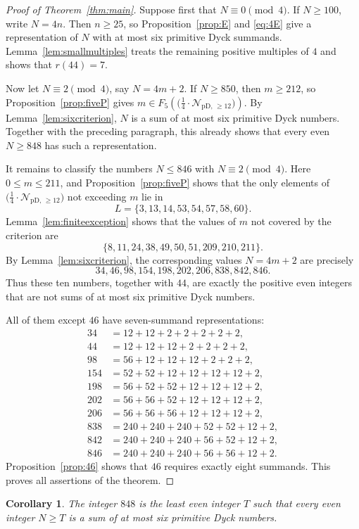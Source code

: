 \documentclass[12pt]{article}
\theoremstyle{plain}
\newtheorem{corollary}[theorem]{Corollary}
\newcommand{\Pset}{\bigl(\tfrac14\cdot
  \mathcal N_{\mathrm{pD,\,\geq12}}\bigr)}
\begin{document}
\begin{proof}[Proof of Theorem~\ref{thm:main}]
Suppose first that $N\equiv0\pmod 4$.  If $N\geq100$, write $N=4n$.
Then $n\geq25$, so Proposition~\ref{prop:E} and \eqref{eq:4E} give a
representation of $N$ with at most six primitive Dyck summands.
Lemma~\ref{lem:smallmultiples} treats the remaining positive multiples
of $4$ and shows that $r(44)=7$.

Now let $N\equiv2\pmod 4$, say $N=4m+2$.  If $N\geq850$, then $m\geq212$,
so Proposition~\ref{prop:fiveP} gives $m\in F_5(\Pset)$.  By
Lemma~\ref{lem:sixcriterion}, $N$ is a sum of at most six primitive
Dyck numbers.  Together with the preceding paragraph, this already
shows that every even $N\geq848$ has such a representation.

It remains to classify the numbers $N\leq846$ with $N\equiv2\pmod 4$.
Here $0\leq m\leq211$, and Proposition~\ref{prop:fiveP} shows that the
only elements of $\Pset$ not exceeding $m$ lie in
\[
 L=\{3,13,14,53,54,57,58,60\}.
\]
Lemma~\ref{lem:finiteexception} shows that the values of $m$ not
covered by the criterion are
\[
 \{8,11,24,38,49,50,51,209,210,211\}.
\]
By Lemma~\ref{lem:sixcriterion}, the corresponding values $N=4m+2$
are precisely
\[
 34,46,98,154,198,202,206,838,842,846.
\]
Thus these ten numbers, together with $44$, are exactly the positive
even integers that are not sums of at most six primitive Dyck numbers.

All of them except $46$ have seven-summand representations:
\[
\begin{aligned}
34&=12+12+2+2+2+2+2,\\
44&=12+12+12+2+2+2+2,\\
98&=56+12+12+12+2+2+2,\\
154&=52+52+12+12+12+12+2,\\
198&=56+52+52+12+12+12+2,\\
202&=56+56+52+12+12+12+2,\\
206&=56+56+56+12+12+12+2,\\
838&=240+240+240+52+52+12+2,\\
842&=240+240+240+56+52+12+2,\\
846&=240+240+240+56+56+12+2.
\end{aligned}
\]
Proposition~\ref{prop:46} shows that $46$ requires exactly eight
summands.  This proves all assertions of the theorem.
\end{proof}

\begin{corollary}\label{cor:threshold}
The integer $848$ is the least even integer $T$ such that every even
integer $N\geq T$ is a sum of at most six primitive Dyck numbers.
\end{corollary}
\end{document}
